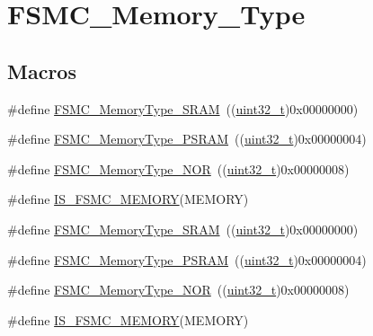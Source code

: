 \hypertarget{group___f_s_m_c___memory___type}{}\section{F\+S\+M\+C\+\_\+\+Memory\+\_\+\+Type}
\label{group___f_s_m_c___memory___type}
\subsection*{Macros}
\begin{DoxyCompactItemize}
\item 
\#define \hyperlink{group___f_s_m_c___memory___type_ga8a24e8da42e67dcf6fb2f43659aa49cf}{F\+S\+M\+C\+\_\+\+Memory\+Type\+\_\+\+S\+R\+AM}~((\hyperlink{_p_e___types_8h_a33594304e786b158f3fb30289278f5af}{uint32\+\_\+t})0x00000000)
\item 
\#define \hyperlink{group___f_s_m_c___memory___type_gae3e680998b2fee8d56222634f5268a75}{F\+S\+M\+C\+\_\+\+Memory\+Type\+\_\+\+P\+S\+R\+AM}~((\hyperlink{_p_e___types_8h_a33594304e786b158f3fb30289278f5af}{uint32\+\_\+t})0x00000004)
\item 
\#define \hyperlink{group___f_s_m_c___memory___type_ga8b9390abe7c281947c550bf4365649e5}{F\+S\+M\+C\+\_\+\+Memory\+Type\+\_\+\+N\+OR}~((\hyperlink{_p_e___types_8h_a33594304e786b158f3fb30289278f5af}{uint32\+\_\+t})0x00000008)
\item 
\#define \hyperlink{group___f_s_m_c___memory___type_ga255cd500e141f4ac024cf5f896921233}{I\+S\+\_\+\+F\+S\+M\+C\+\_\+\+M\+E\+M\+O\+RY}(M\+E\+M\+O\+RY)
\item 
\#define \hyperlink{group___f_s_m_c___memory___type_ga8a24e8da42e67dcf6fb2f43659aa49cf}{F\+S\+M\+C\+\_\+\+Memory\+Type\+\_\+\+S\+R\+AM}~((\hyperlink{_p_e___types_8h_a33594304e786b158f3fb30289278f5af}{uint32\+\_\+t})0x00000000)
\item 
\#define \hyperlink{group___f_s_m_c___memory___type_gae3e680998b2fee8d56222634f5268a75}{F\+S\+M\+C\+\_\+\+Memory\+Type\+\_\+\+P\+S\+R\+AM}~((\hyperlink{_p_e___types_8h_a33594304e786b158f3fb30289278f5af}{uint32\+\_\+t})0x00000004)
\item 
\#define \hyperlink{group___f_s_m_c___memory___type_ga8b9390abe7c281947c550bf4365649e5}{F\+S\+M\+C\+\_\+\+Memory\+Type\+\_\+\+N\+OR}~((\hyperlink{_p_e___types_8h_a33594304e786b158f3fb30289278f5af}{uint32\+\_\+t})0x00000008)
\item 
\#define \hyperlink{group___f_s_m_c___memory___type_ga255cd500e141f4ac024cf5f896921233}{I\+S\+\_\+\+F\+S\+M\+C\+\_\+\+M\+E\+M\+O\+RY}(M\+E\+M\+O\+RY)
\end{DoxyCompactItemize}


